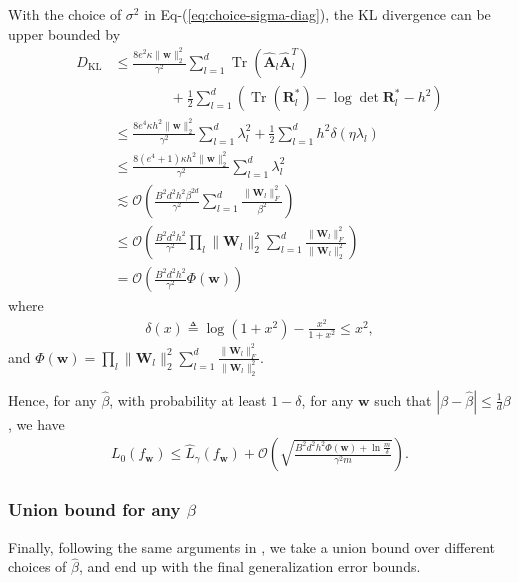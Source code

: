 \documentclass[journal]{IEEEtran} %
\def\eqref#1{Eq-(\ref{#1})}
\newcommand{\nn}{\nonumber}
\def\vw{{\bm{w}}}
\def\mA{{\bm{A}}}
\def\mR{{\bm{R}}}
\def\mW{{\bm{W}}}
\def\gO{{\mathcal{O}}}
\newcommand{\KL}{D_{\mathrm{KL}}}
\newcommand{\Norm}[1]{\|#1\|}
\newcommand{\Abs}[1]{|#1|}
\DeclareMathOperator{\Tr}{Tr}
\begin{document}
With the choice of $\sigma^2$ in \eqref{eq:choice-sigma-diag}, the KL divergence can be upper bounded by
\begin{align}
    \KL & \le \frac{8e^{2} \kappa\Norm{\vw}_2^2}{\gamma^2} \sum_{l=1}^d \Tr(\hat{\mA}_l \hat{\mA}_l^T) \nn \\
    & \qquad \qquad + \frac{1}{2} \sum_{l=1}^d \left(\Tr(\mR_l^*)  - \log \det \mR_l^* - h^2 \right)\\
    &\le \frac{8 e^4 \kappa h^2 \Norm{\vw}_2^2}{\gamma^2 }   \sum_{l=1}^d \lambda_l^2 + \frac{1}{2}\sum_{l=1}^d h^2 \delta({\eta}{\lambda}_l)\\
    &\le \frac{8 (e^4+1) \kappa h^2 \Norm{\vw}_2^2 }{\gamma^2 } \sum_{l=1}^d \lambda_l^2\\
    &\lesssim \gO\left(  \frac{B^2 d^2 h^2\beta^{2d}}{\gamma^2} \sum_{l=1}^d\frac{\Norm{\mW_l}_F^2}{\beta^2}\right) \\
    &\le \gO\left(\frac{B^2d^2h^2}{\gamma^2} \prod_l \Norm{\mW_l}_2^2 \sum_{l=1}^d \frac{\Norm{\mW_l}_F^2}{\Norm{\mW_l}_2^2}\right)\\
    &=\gO\left(\frac{B^2d^2h^2}{\gamma^2} \Phi(\vw)\right)
\end{align}
where 
\begin{align} \label{eq:delta-func}
    \delta(x)\triangleq\log(1+x^2)-\frac{x^2}{1+x^2} \le x^2,
\end{align}
and $\Phi(\vw)=\prod_l \Norm{\mW_l}_2^2  \sum_{l=1}^d \frac{\Norm{\mW_l}_F^2}{\Norm{\mW_l}_2^2}$. 


Hence, for any $\hat{\beta}$, with probability at least $1-\delta$, for any $\vw$ such that $\Abs{\beta-\hat{\beta}} \le \frac{1}{d}\beta$, we have
\begin{align}
    L_0(f_{\vw}) \le \hat{L}_{\gamma}(f_{\vw}) + \mathcal{O} \left( \sqrt{ \frac{B^2d^2h^2 \Phi(\vw) + \ln \frac{m}{\delta}}{\gamma^2m}} \right).
\end{align}



\subsubsection{Union bound for any $\beta$}
Finally, following the same arguments in \cite{neyshabur2018pac}, we take a union bound over different choices of $\hat{\beta}$, and end up with the final generalization error bounds. 
\end{document}
